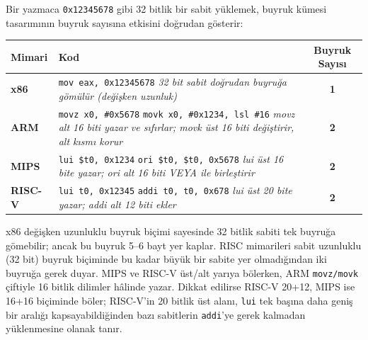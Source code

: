 \begin{karsilastirma}
Bir yazmaca \texttt{0x12345678} gibi 32 bitlik bir sabit yüklemek, buyruk kümesi tasarımının buyruk sayısına etkisini doğrudan gösterir:

\begin{center}
\footnotesize
\begin{tabular}{lp{10cm}c}
\toprule
\textbf{Mimari} & \textbf{Kod} & \textbf{Buyruk Sayısı} \\
\midrule
\textbf{x86} & \texttt{mov eax, 0x12345678} \newline \textit{\scriptsize 32 bit sabit doğrudan buyruğa gömülür (değişken uzunluk)} & \textbf{1} \\
\midrule
\textbf{ARM} & \texttt{movz x0, \#0x5678} \newline \texttt{movk x0, \#0x1234, lsl \#16} \newline \textit{\scriptsize movz alt 16 biti yazar ve sıfırlar; movk üst 16 biti değiştirir, alt kısmı korur} & \textbf{2} \\
\midrule
\textbf{MIPS} & \texttt{lui \$t0, 0x1234} \newline \texttt{ori \$t0, \$t0, 0x5678} \newline \textit{\scriptsize lui üst 16 bite yazar; ori alt 16 biti VEYA ile birleştirir} & \textbf{2} \\
\midrule
\textbf{RISC-V} & \texttt{lui t0, 0x12345} \newline \texttt{addi t0, t0, 0x678} \newline \textit{\scriptsize lui üst 20 bite yazar; addi alt 12 biti ekler} & \textbf{2} \\
\bottomrule
\end{tabular}
\end{center}

x86 değişken uzunluklu buyruk biçimi sayesinde 32 bitlik sabiti tek buyruğa gömebilir; ancak bu buyruk 5--6 bayt yer kaplar. RISC mimarileri sabit uzunluklu (32 bit) buyruk biçiminde bu kadar büyük bir sabite yer olmadığından iki buyruğa gerek duyar. MIPS ve RISC-V üst/alt yarıya bölerken, ARM \texttt{movz/movk} çiftiyle 16 bitlik dilimler hâlinde yazar. Dikkat edilirse RISC-V 20+12, MIPS ise 16+16 biçiminde böler; RISC-V'in 20 bitlik üst alanı, \texttt{lui} tek başına daha geniş bir aralığı kapsayabildiğinden bazı sabitlerin \texttt{addi}'ye gerek kalmadan yüklenmesine olanak tanır.
\end{karsilastirma}

